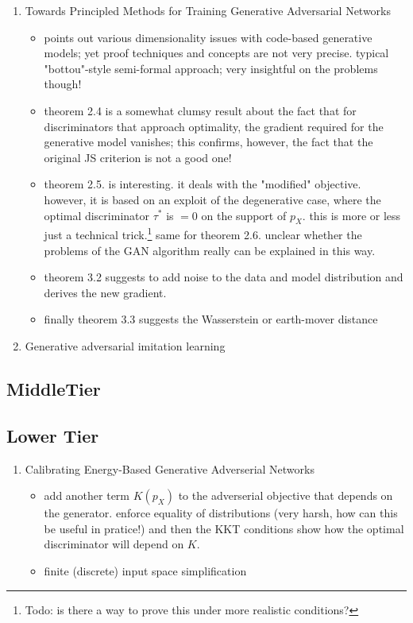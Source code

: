 \documentclass{article}
\begin{document}
\begin{enumerate}
\item Towards Principled Methods for Training Generative Adversarial Networks  \cite{arjovsky17principled}
\begin{itemize}
\item points out various dimensionality issues with code-based generative models; yet proof techniques and concepts are not very precise. typical "bottou"-style semi-formal approach; very insightful on the problems though!
\item theorem 2.4 is a somewhat clumsy result about the fact that for discriminators that approach optimality, the gradient required for the generative model vanishes; this confirms, however, the fact that the original JS criterion is not a good one!
\item theorem 2.5. is interesting. it deals with the "modified" objective. however, it is based on an exploit of the degenerative case, where the optimal discriminator $\tau^*$ is $=0$ on the support of $p_X$. this is more or less just a technical trick.\footnote{Todo: is there a way to prove this under more realistic conditions?} same for theorem 2.6. unclear whether the problems of the GAN algorithm really can be explained in this way.
\item theorem 3.2 suggests to add noise to the data and model distribution and derives the new gradient. 
\item finally theorem 3.3 suggests the Wasserstein or earth-mover distance
\end{itemize}
\item Generative adversarial imitation learning
\end{enumerate}

\subsection{MiddleTier}


\subsection{Lower Tier}

\begin{enumerate}
\item Calibrating Energy-Based Generative Adverserial Networks \cite{dai2017calibrating}
\begin{itemize}
\item add another term $K(p_X)$ to the adverserial objective that depends on the generator. enforce equality of distributions (very harsh, how can this be useful in pratice!) and then the KKT conditions show how the optimal discriminator will depend on $K$.
\item finite (discrete) input space simplification 
\end{itemize}
\end{enumerate}




\end{document}

